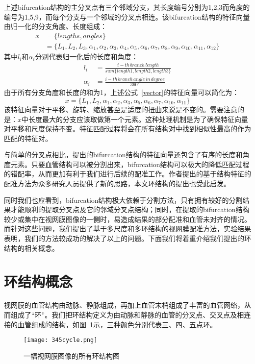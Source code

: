  上述bifurcation结构的主分叉点有三个邻域分支，其长度编号分别为1,2,3而角度的编号为1,5,9，而每个分支与一个邻域的分叉点相连。该bifurcation结构的特征向量由归一化的分支角度、长度组成：
 \begin{equation}
 \begin{split}
x&=\{lengths,angles\}\\
&=\{L_{1},L_{2},L_{3},\alpha_{1},\alpha_{2},\alpha_{3},\alpha_{4},\alpha_{5},\alpha_{6},\alpha_{7},\alpha_{8},\alpha_{9},\alpha_{10},\alpha_{11},\alpha_{12}\}
\label{vector}
\end{split}
\end{equation}
其中$l_i$和$\alpha_i$分别代表归一化后的长度和角度：
 \begin{equation}
 \begin{split}
l_i&=\frac{i-th\,branch\, length}{sum\{length1,length2,length3\}}\\
\alpha_i&=\frac{i-th\,branch\,angle\,in\,degree}{360^{\circ}}
\end{split}
\end{equation}	 	
由于所有分支角度和长度的和为1，上述公式~\ref{vector}的特征向量可以简化为：
\begin{equation}
x=\{L_{1},L_{2},\alpha_{1},\alpha_{2},\alpha_{3},\alpha_{5},\alpha_{6},\alpha_{7},\alpha_{10},\alpha_{11}\}
\end{equation}	 	
该特征向量对于平移、旋转、缩放甚至是适度的扭曲来说是不变的。需要注意的是：$x$中长度最大的分支应该取做第一个元素。这种处理机制是为了确保特征向量对平移和尺度保持不变。特征匹配过程将会在所有结构对中找到相似性最高的作为匹配的特征对。
 
与简单的分叉点相比，提出的bifurcation结构的特征向量还包含了有序的长度和角度元素。只要血管结构可以被分割出来，bifurcation结构可以极大的降低匹配过程的错配率，从而更加有利于我们进行后续的配准工作。作者提出的基于结构特征的配准方法为众多研究人员提供了新的思路，本文环结构的提出也受此启发。
 
同时我们也应看到，bifurcation结构极大依赖于分割方法，只有拥有较好的分割结果才能顺利的提取分叉点及它的邻域分叉点结构；同时，在提取的bifurcation结构较少或集中在视网膜图像的一侧时，易造成结果的部分配准和血管未对齐的情况。而针对这些问题，我们提出了基于多尺度和多环结构的视网膜配准方法，实验结果表明，我们的方法较成功的解决了以上的问题。下面我们将着重介绍我们提出的环结构的相关概念。
 
 \section{环结构概念}
 视网膜的血管结构由动脉、静脉组成，再加上血管末梢组成了丰富的血管网络，从而组成了“环”。我们把环结构定义为由动脉和静脉的血管的分叉点、交叉点及相连接的血管组成的结构，如图~\ref{345cycle}示，三种颜色分别代表三、四、五点环。
  \begin{figure}[ht!]
   \centering
  \texttt{[image: 345cycle.png]}
  \caption{一幅视网膜图像的所有环结构图}
    \label{345cycle}
 \end{figure}

